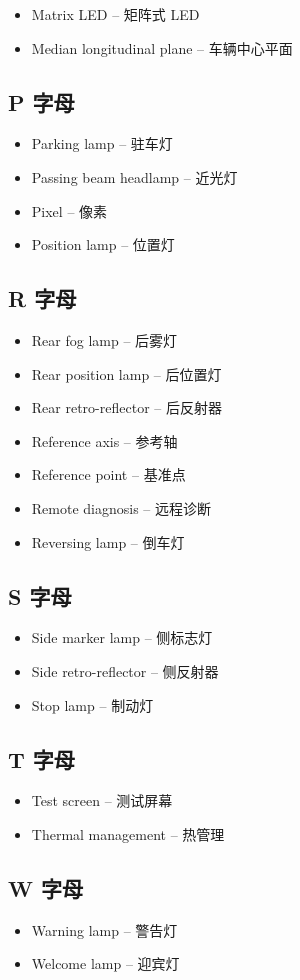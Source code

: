 \begin{itemize}[leftmargin=2em]
    \item Matrix LED -- 矩阵式 LED
    \item Median longitudinal plane -- 车辆中心平面
\end{itemize}

\subsection{P 字母}

\begin{itemize}[leftmargin=2em]
    \item Parking lamp -- 驻车灯
    \item Passing beam headlamp -- 近光灯
    \item Pixel -- 像素
    \item Position lamp -- 位置灯
\end{itemize}

\subsection{R 字母}

\begin{itemize}[leftmargin=2em]
    \item Rear fog lamp -- 后雾灯
    \item Rear position lamp -- 后位置灯
    \item Rear retro-reflector -- 后反射器
    \item Reference axis -- 参考轴
    \item Reference point -- 基准点
    \item Remote diagnosis -- 远程诊断
    \item Reversing lamp -- 倒车灯
\end{itemize}

\subsection{S 字母}

\begin{itemize}[leftmargin=2em]
    \item Side marker lamp -- 侧标志灯
    \item Side retro-reflector -- 侧反射器
    \item Stop lamp -- 制动灯
\end{itemize}

\subsection{T 字母}

\begin{itemize}[leftmargin=2em]
    \item Test screen -- 测试屏幕
    \item Thermal management -- 热管理
\end{itemize}

\subsection{W 字母}

\begin{itemize}[leftmargin=2em]
    \item Warning lamp -- 警告灯
    \item Welcome lamp -- 迎宾灯
\end{itemize}